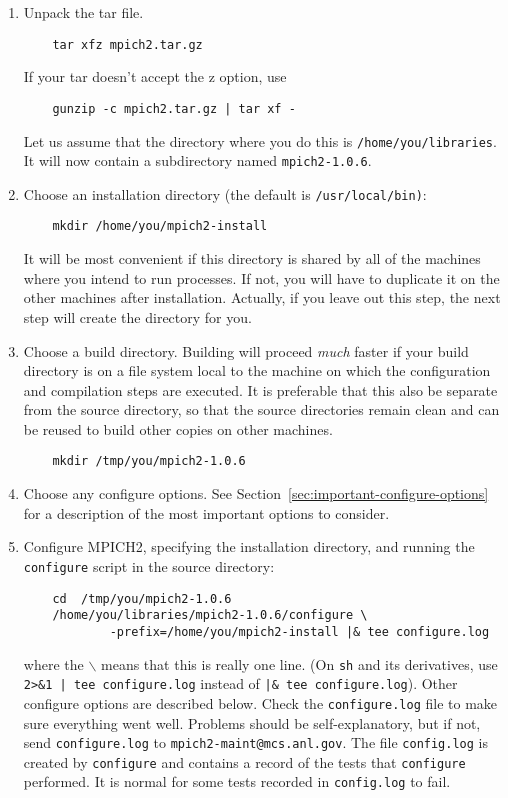 \documentclass[dvipdfm,11pt]{article}
\begin{document}
\begin{enumerate}
\item 
Unpack the tar file.
\begin{verbatim}
    tar xfz mpich2.tar.gz
\end{verbatim}
If your tar doesn't accept the z option, use
\begin{verbatim}
    gunzip -c mpich2.tar.gz | tar xf -
\end{verbatim}
Let us assume that the directory where you do this is
\texttt{/home/you/libraries}.  It will now contain a subdirectory named
\texttt{mpich2-1.0.6}.

\item
Choose an installation directory (the default is \texttt{/usr/local/bin)}:
\begin{verbatim}
    mkdir /home/you/mpich2-install
\end{verbatim}
It will be most convenient if this directory is shared by all of the
machines where you intend to run processes.  If not, you will have
to duplicate it on the other machines after installation.  Actually, if
you leave out this step, the next step will create the directory for you.

\item
Choose a build directory.  Building will proceed \emph{much} faster if
your build directory is on a file system local to the machine on which
the configuration and compilation steps are executed.  It is preferable
that this also be separate from the source directory, so that the
source directories remain
clean and can be reused to build other copies on other machines.
\begin{verbatim}
    mkdir /tmp/you/mpich2-1.0.6
\end{verbatim}

\item
Choose any configure options.  See
Section~\ref{sec:important-configure-options} for a description of the most
important options to consider.  

\item
Configure MPICH2, specifying the installation directory, and running
the \texttt{configure} script in the source directory:
\begin{verbatim}
    cd  /tmp/you/mpich2-1.0.6
    /home/you/libraries/mpich2-1.0.6/configure \
            -prefix=/home/you/mpich2-install |& tee configure.log
\end{verbatim}
where the \texttt{$\backslash$} means that this is really one line.  (On
\texttt{sh} and its derivatives, use \verb+2>&1 | tee configure.log+
instead of \verb+|& tee configure.log+).  Other configure options are
described below.  Check the \texttt{configure.log} file to make sure
everything went well.  Problems should be self-explanatory, but if not,
send \texttt{configure.log} to \texttt{mpich2-maint@mcs.anl.gov}.
The file \texttt{config.log} is created by \texttt{configure} and
contains a record of the tests that \texttt{configure} performed.  It
is normal for some tests recorded in \texttt{config.log} to fail.  


\end{enumerate}
\end{document}
